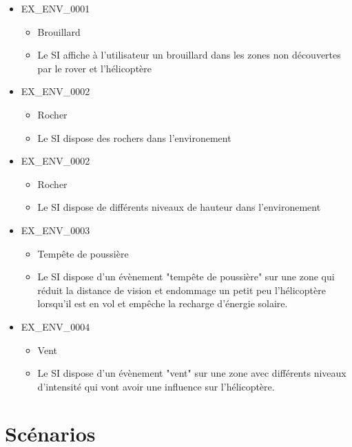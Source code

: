 \documentclass[12pt,a4paper]{scrartcl}
\begin{document}
\begin{itemize}

\item EX\_ENV\_0001
\begin{itemize}
\item Brouillard
\item Le SI affiche à l'utilisateur un brouillard dans les zones non découvertes par le rover et l'hélicoptère
\end{itemize}

\item EX\_ENV\_0002
\begin{itemize}
\item Rocher
\item Le SI dispose des rochers dans l'environement
\end{itemize}

\item EX\_ENV\_0002
\begin{itemize}
\item Rocher
\item Le SI dispose de différents niveaux de hauteur dans l'environement
\end{itemize}

\item EX\_ENV\_0003
\begin{itemize}
\item Tempête de poussière
\item Le SI dispose d'un évènement "tempête de poussière" sur une zone qui
		réduit la distance de vision et endommage un petit peu l'hélicoptère 
		lorsqu'il est en vol et empêche la recharge d'énergie solaire.
\end{itemize}

\item EX\_ENV\_0004
\begin{itemize}
\item Vent
\item Le SI dispose d'un évènement "vent" sur une zone avec différents niveaux d'intensité qui vont avoir une influence sur l'hélicoptère.
\end{itemize}

\end{itemize}

\section {Scénarios}
\end{document}
